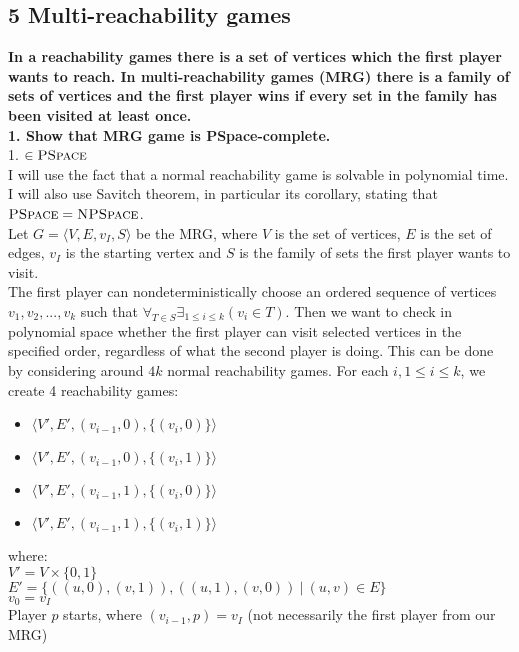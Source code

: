 \subsection*{5 Multi-reachability games}
\textbf{In a reachability games there is a set of vertices which the first player
wants to reach. In multi-reachability games (MRG) there is a family of
sets of vertices and the first player wins if every set in the family has been
visited at least once.\\
1. Show that MRG game is PSpace-complete.}\\
1. \underline{$\in \textsc{PSpace}$}\\
I will use the fact that a normal reachability game is solvable in polynomial time.
I will also use Savitch theorem, in particular its corollary, stating that
$\textsc{PSpace} = \textsc{NPSpace}$.\\
Let $G = \langle V, E, v_I, S \rangle$ be the MRG, where $V$ is the set of vertices,
$E$ is the set of edges, $v_I$ is the starting vertex and $S$ is the family of sets
the first player wants to visit.\\
The first player can nondeterministically choose an ordered sequence of vertices
$v_1, v_2, ..., v_k$ such that $\forall_{T \in S} \exists_{1 \leq i \leq k} (v_i \in T)$.
Then we want to check in polynomial space whether the first player can visit selected
vertices in the specified order, regardless of what the second player is doing.
This can be done by considering around $4k$ normal reachability games. For each $i, 1 \leq i \leq k$,
we create 4 reachability games:
\begin{itemize}
      \item $\langle V', E', (v_{i-1}, 0), \{ (v_i, 0) \} \rangle$
      \item $\langle V', E', (v_{i-1}, 0), \{ (v_i, 1) \} \rangle$
      \item $\langle V', E', (v_{i-1}, 1), \{ (v_i, 0) \} \rangle$
      \item $\langle V', E', (v_{i-1}, 1), \{ (v_i, 1) \} \rangle$
\end{itemize}
where:\\
$V' = V \times \{0,1\}$\\
$E' = \{ ((u,0), (v,1)), ((u,1),(v,0)) \ |\ (u, v) \in E \}$\\
$v_0 = v_I$\\
Player $p$ starts, where $(v_{i-1}, p) = v_I$ (not necessarily the first player from our MRG)\\

